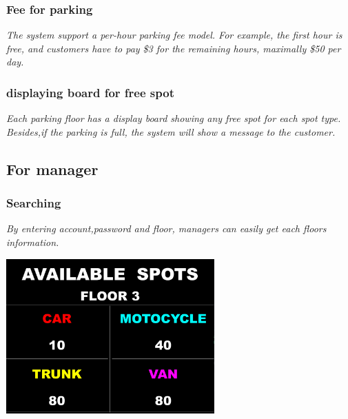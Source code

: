 {{	\subsubsection{Fee for parking}
	{\slshape \selectfont
		The system support a per-hour parking fee model. For example, the first hour is free,
		and customers have to pay \$3 for the remaining hours, maximally \$50 per day.
	}
	\subsubsection{displaying board for free spot}
	{\slshape \selectfont
		Each parking floor has a display board showing any free spot for each spot type. Besides,if the parking is full, the system will show a message to the customer.
	}
	\newpage
	\subsection{For manager}
	\subsubsection{Searching}
	{\slshape \selectfont
		By entering account,password and floor, managers can easily get each floors information.
		\vspace{2cm}
		\begin{center}
			\centering
			\includegraphics[width=0.6\textwidth]{pics/Floor3.png}
		\end{center}
		\vspace{10cm}
}}}
